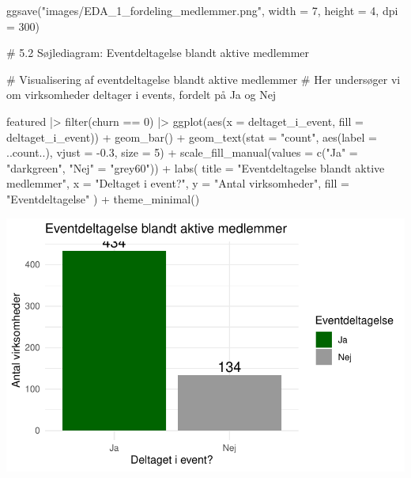 \documentclass[
  11pt,
  letterpaper,
  DIV=11,
  numbers=noendperiod]{scrartcl}
\newenvironment{Shaded}{\begin{snugshade}}{\end{snugshade}}
\newcommand{\AttributeTok}[1]{\textcolor[rgb]{0.40,0.45,0.13}{#1}}
\newcommand{\CommentTok}[1]{\textcolor[rgb]{0.37,0.37,0.37}{#1}}
\newcommand{\DecValTok}[1]{\textcolor[rgb]{0.68,0.00,0.00}{#1}}
\newcommand{\FloatTok}[1]{\textcolor[rgb]{0.68,0.00,0.00}{#1}}
\newcommand{\FunctionTok}[1]{\textcolor[rgb]{0.28,0.35,0.67}{#1}}
\newcommand{\NormalTok}[1]{\textcolor[rgb]{0.00,0.23,0.31}{#1}}
\newcommand{\OtherTok}[1]{\textcolor[rgb]{0.00,0.23,0.31}{#1}}
\newcommand{\SpecialCharTok}[1]{\textcolor[rgb]{0.37,0.37,0.37}{#1}}
\newcommand{\StringTok}[1]{\textcolor[rgb]{0.13,0.47,0.30}{#1}}
\begin{document}
\begin{Shaded}
\begin{Highlighting}[]
\FunctionTok{ggsave}\NormalTok{(}\StringTok{"images/EDA\_1\_fordeling\_medlemmer.png"}\NormalTok{, }\AttributeTok{width =} \DecValTok{7}\NormalTok{, }\AttributeTok{height =} \DecValTok{4}\NormalTok{, }\AttributeTok{dpi =} \DecValTok{300}\NormalTok{)}


\CommentTok{\# 5.2 Søjlediagram: Eventdeltagelse blandt aktive medlemmer}

\CommentTok{\# Visualisering af eventdeltagelse blandt aktive medlemmer}
\CommentTok{\# Her undersøger vi om virksomheder deltager i events, fordelt på \textquotesingle{}Ja\textquotesingle{} og \textquotesingle{}Nej\textquotesingle{}}

\NormalTok{featured }\SpecialCharTok{|\textgreater{}}
  \FunctionTok{filter}\NormalTok{(churn }\SpecialCharTok{==} \DecValTok{0}\NormalTok{) }\SpecialCharTok{|\textgreater{}}
  \FunctionTok{ggplot}\NormalTok{(}\FunctionTok{aes}\NormalTok{(}\AttributeTok{x =}\NormalTok{ deltaget\_i\_event, }\AttributeTok{fill =}\NormalTok{ deltaget\_i\_event)) }\SpecialCharTok{+}
  \FunctionTok{geom\_bar}\NormalTok{() }\SpecialCharTok{+}
  \FunctionTok{geom\_text}\NormalTok{(}\AttributeTok{stat =} \StringTok{"count"}\NormalTok{, }\FunctionTok{aes}\NormalTok{(}\AttributeTok{label =}\NormalTok{ ..count..), }\AttributeTok{vjust =} \SpecialCharTok{{-}}\FloatTok{0.3}\NormalTok{, }\AttributeTok{size =} \DecValTok{5}\NormalTok{) }\SpecialCharTok{+}
  \FunctionTok{scale\_fill\_manual}\NormalTok{(}\AttributeTok{values =} \FunctionTok{c}\NormalTok{(}\StringTok{"Ja"} \OtherTok{=} \StringTok{"darkgreen"}\NormalTok{, }\StringTok{"Nej"} \OtherTok{=} \StringTok{"grey60"}\NormalTok{)) }\SpecialCharTok{+}
  \FunctionTok{labs}\NormalTok{(}
    \AttributeTok{title =} \StringTok{"Eventdeltagelse blandt aktive medlemmer"}\NormalTok{,}
    \AttributeTok{x =} \StringTok{"Deltaget i event?"}\NormalTok{,}
    \AttributeTok{y =} \StringTok{"Antal virksomheder"}\NormalTok{,}
    \AttributeTok{fill =} \StringTok{"Eventdeltagelse"}
\NormalTok{  ) }\SpecialCharTok{+}
  \FunctionTok{theme\_minimal}\NormalTok{()}
\end{Highlighting}
\end{Shaded}

\includegraphics{Quarto_files/figure-pdf/unnamed-chunk-6-2.pdf}
\end{document}
